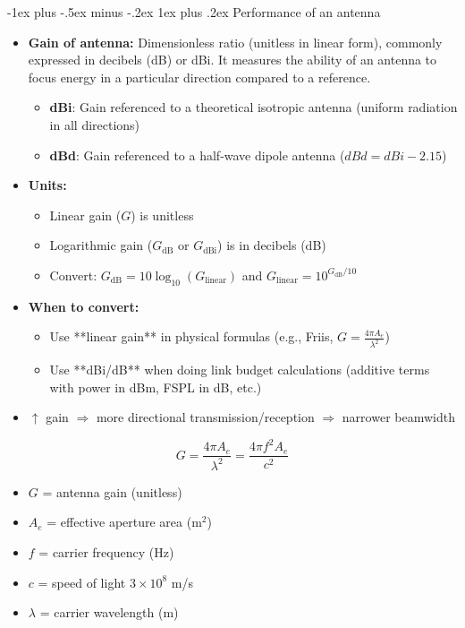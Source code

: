 \documentclass[10pt,landscape]{article}
\makeatletter
\newcommand{\subsubsubsection}{\@startsection{subsubsection}{3}{0mm}%
                                {-1ex plus -.5ex minus -.2ex}%
                                {1ex plus .2ex}%
                                {\normalfont\scriptsize\bfseries}}
\newcommand{\1}{\mathmybb{1}}
\makeatother
\begin{document}
\begin{multicols*}{3}
\subsubsubsection{Performance of an antenna}
\begin{itemize}
  \item \textbf{Gain of antenna:} Dimensionless ratio (unitless in linear form), commonly expressed in decibels (dB) or dBi. It measures the ability of an antenna to focus energy in a particular direction compared to a reference.
  \begin{itemize}
    \item \textbf{dBi}: Gain referenced to a theoretical isotropic antenna (uniform radiation in all directions)
    \item \textbf{dBd}: Gain referenced to a half-wave dipole antenna ($dBd = dBi - 2.15$)
  \end{itemize}
  \item \textbf{Units:}
  \begin{itemize}
    \item Linear gain ($G$) is unitless
    \item Logarithmic gain ($G_{\text{dB}}$ or $G_{\text{dBi}}$) is in decibels (dB)
    \item Convert: $G_{\text{dB}} = 10 \log_{10}(G_{\text{linear}})$ and $G_{\text{linear}} = 10^{G_{\text{dB}} / 10}$
  \end{itemize}
  \item \textbf{When to convert:}
  \begin{itemize}
    \item Use **linear gain** in physical formulas (e.g., Friis, $G = \frac{4 \pi A_e}{\lambda^2}$)
    \item Use **dBi/dB** when doing link budget calculations (additive terms with power in dBm, FSPL in dB, etc.)
  \end{itemize}
  \item $\uparrow$ gain $\Rightarrow$ more directional transmission/reception $\Rightarrow$ narrower beamwidth
\end{itemize}

\begin{multicols}{2}
  \[
    \boxed{G = \frac{4 \pi A_e}{\lambda^2} = \frac{4 \pi f^2 A_e}{c^2}}
  \]
  \columnbreak
  \begin{itemize}
    \item $G$ = antenna gain (unitless)
    \item $A_e$ = effective aperture area (m$^2$)
    \item $f$ = carrier frequency (Hz)
    \item $c$ = speed of light $3 \times 10^8$ m/s
    \item $\lambda$ = carrier wavelength (m)
  \end{itemize}
\end{multicols}


\end{multicols*}
\end{document}

